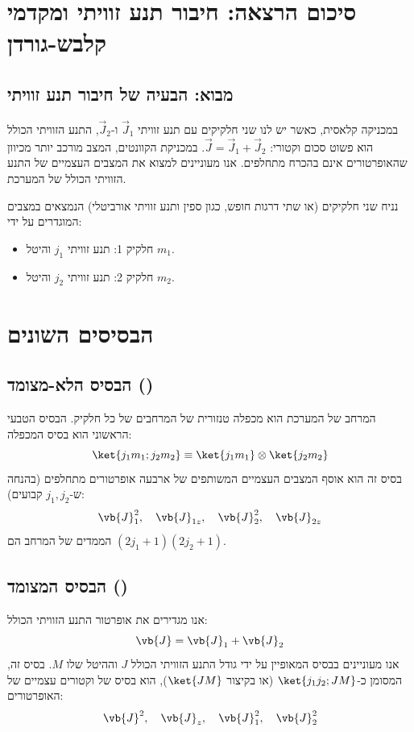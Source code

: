 \section{סיכום הרצאה: חיבור תנע זוויתי ומקדמי קלבש-גורדן}
\subsection{מבוא: הבעיה של חיבור תנע זוויתי}
במכניקה קלאסית, כאשר יש לנו שני חלקיקים עם תנע זוויתי $\vec{J}_1$ ו-$\vec{J}_2$, התנע הזוויתי הכולל הוא פשוט סכום וקטורי: $\vec{J} = \vec{J}_1 + \vec{J}_2$.
במכניקת הקוונטים, המצב מורכב יותר מכיוון שהאופרטורים אינם בהכרח מתחלפים. אנו מעוניינים למצוא את המצבים העצמיים של התנע הזוויתי הכולל של המערכת.

נניח שני חלקיקים (או שתי דרגות חופש, כגון ספין ותנע זוויתי אורביטלי) הנמצאים במצבים המוגדרים על ידי:
\begin{itemize}
    \item חלקיק 1: תנע זוויתי $j_1$ והיטל $m_1$.
    \item חלקיק 2: תנע זוויתי $j_2$ והיטל $m_2$.
\end{itemize}

\section{הבסיסים השונים}

\subsection{הבסיס הלא-מצומד ()}
המרחב של המערכת הוא מכפלה טנזורית של המרחבים של כל חלקיק. הבסיס הטבעי הראשוני הוא בסיס המכפלה:
\[
\ket{j_1 m_1; j_2 m_2} \equiv \ket{j_1 m_1} \otimes \ket{j_2 m_2}
\]
בסיס זה הוא אוסף המצבים העצמיים המשותפים של ארבעה אופרטורים מתחלפים (בהנחה ש-$j_1, j_2$ קבועים):
\[
\vb{J}_1^2, \quad \vb{J}_{1z}, \quad \vb{J}_2^2, \quad \vb{J}_{2z}
\]
הממדים של המרחב הם $(2j_1+1)(2j_2+1)$.

\subsection{הבסיס המצומד ()}
אנו מגדירים את אופרטור התנע הזוויתי הכולל:
\[
\vb{J} = \vb{J}_1 + \vb{J}_2
\]
אנו מעוניינים בבסיס המאופיין על ידי גודל התנע הזוויתי הכולל $J$ וההיטל שלו $M$. בסיס זה, המסומן כ-$\ket{j_1 j_2; J M}$ (או בקיצור $\ket{J M}$), הוא בסיס של וקטורים עצמיים של האופרטורים:
\[
\vb{J}^2, \quad \vb{J}_z, \quad \vb{J}_1^2, \quad \vb{J}_2^2
\]

